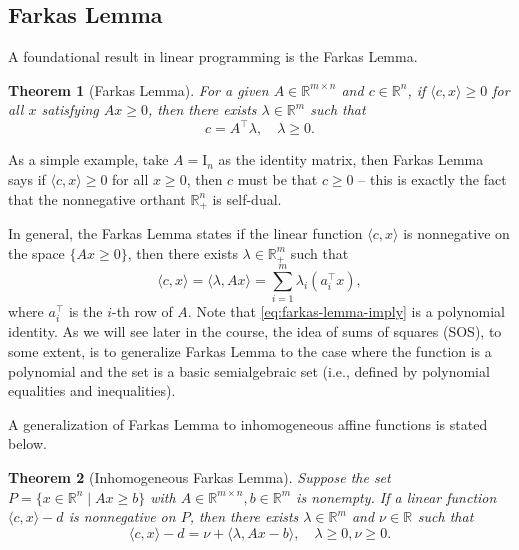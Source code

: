 \documentclass[
]{book}
\newtheorem{theorem}{Theorem}[chapter]
\theoremstyle{definition}
\theoremstyle{definition}
\theoremstyle{definition}
\theoremstyle{definition}
\theoremstyle{remark}
\begin{document}
\subsection{Farkas Lemma}\label{farkas-lemma}

A foundational result in linear programming is the Farkas Lemma.

\begin{theorem}[Farkas Lemma]
\protect\hypertarget{thm:FarkasLemma}{}\label{thm:FarkasLemma}For a given \(A \in \mathbb{R}^{m \times n}\) and \(c \in \mathbb{R}^{n}\), if \(\langle c, x \rangle \geq 0\) for all \(x\) satisfying \(Ax \geq 0\), then there exists \(\lambda \in \mathbb{R}^{m}\) such that
\[
c = A^\top\lambda, \quad \lambda \geq 0.
\]
\end{theorem}

As a simple example, take \(A = \mathrm{I}_n\) as the identity matrix, then Farkas Lemma says if \(\langle c, x \rangle \geq 0\) for all \(x \geq 0\), then \(c\) must be that \(c \geq 0\) -- this is exactly the fact that the nonnegative orthant \(\mathbb{R}^{n}_{+}\) is self-dual.

In general, the Farkas Lemma states if the linear function \(\langle c, x \rangle\) is nonnegative on the space \(\{ Ax \geq 0 \}\), then there exists \(\lambda \in \mathbb{R}^{m}_{+}\) such that
\begin{equation}
\langle c, x \rangle = \langle \lambda,  Ax \rangle = \sum_{i=1}^m \lambda_i (a_i^\top x),
\label{eq:farkas-lemma-imply}
\end{equation}
where \(a_i^\top\) is the \(i\)-th row of \(A\). Note that \eqref{eq:farkas-lemma-imply} is a polynomial identity. As we will see later in the course, the idea of sums of squares (SOS), to some extent, is to generalize Farkas Lemma to the case where the function is a polynomial and the set is a basic semialgebraic set (i.e., defined by polynomial equalities and inequalities).

A generalization of Farkas Lemma to inhomogeneous affine functions is stated below.

\begin{theorem}[Inhomogeneous Farkas Lemma]
\protect\hypertarget{thm:InhomogeneousFarkasLemma}{}\label{thm:InhomogeneousFarkasLemma}Suppose the set \(P = \{ x \in \mathbb{R}^{n} \mid A x \geq b \}\) with \(A \in \mathbb{R}^{m \times n}, b \in \mathbb{R}^{m}\) is nonempty. If a linear function \(\langle c, x \rangle - d\) is nonnegative on \(P\), then there exists \(\lambda \in \mathbb{R}^{m}\) and \(\nu \in \mathbb{R}^{}\) such that
\[
\langle c, x \rangle - d = \nu + \langle \lambda, A x - b \rangle, \quad \lambda \geq 0, \nu \geq 0. 
\]
\end{theorem}
\end{document}
